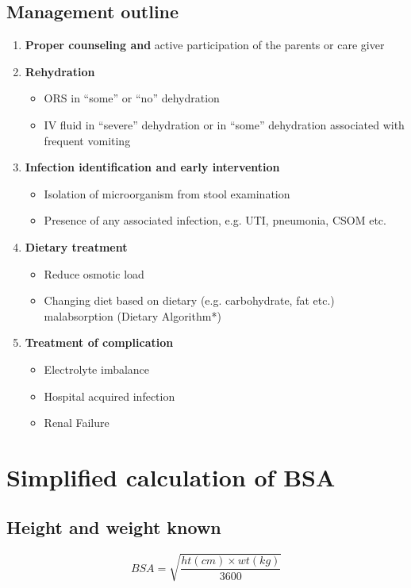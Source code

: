 \documentclass[11pt,a4paper]{report}
\begin{document}
\subsection{Management outline}
\begin{enumerate}
	\item \textbf{Proper counseling and } active participation of the parents or care giver
	\item \textbf{Rehydration}
	\begin{itemize}
		\item ORS in ``some'' or ``no'' dehydration
		\item IV fluid in ``severe'' dehydration or in ``some'' dehydration associated with frequent vomiting
	\end{itemize}
	\item \textbf{Infection identification and early intervention}
	\begin{itemize}
		\item Isolation of microorganism from stool examination
		\item Presence of any associated infection, e.g. UTI, pneumonia, CSOM etc.
	\end{itemize}
	\item \textbf{Dietary treatment}
	\begin{itemize}
		\item Reduce osmotic load
		\item Changing diet based on dietary (e.g. carbohydrate, fat etc.) malabsorption (Dietary Algorithm*)
	\end{itemize}
	\item \textbf{Treatment of complication}
	\begin{itemize}
		\item Electrolyte imbalance
		\item Hospital acquired infection
		\item Renal Failure
	\end{itemize}
\end{enumerate}


\newpage
\section[BSA Calculation]{Simplified calculation of BSA}
\subsection{Height and weight known}
\[BSA = \sqrt{\frac{ht(cm) \times wt(kg)}{3600} } \]
\end{document}
